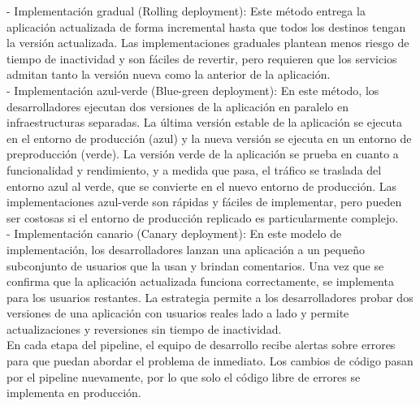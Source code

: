 \documentclass[12pt]{book}
\begin{document}
\begin{itemize}
    - Implementación gradual (Rolling deployment): Este método entrega la aplicación actualizada de forma incremental hasta que todos los destinos tengan la versión actualizada. Las implementaciones graduales plantean menos riesgo de tiempo de inactividad y son fáciles de revertir, pero requieren que los servicios admitan tanto la versión nueva como la anterior de la aplicación.\\
    - Implementación azul-verde (Blue-green deployment): En este método, los desarrolladores ejecutan dos versiones de la aplicación en paralelo en infraestructuras separadas. La última versión estable de la aplicación se ejecuta en el entorno de producción (azul) y la nueva versión se ejecuta en un entorno de preproducción (verde). La versión verde de la aplicación se prueba en cuanto a funcionalidad y rendimiento, y a medida que pasa, el tráfico se traslada del entorno azul al verde, que se convierte en el nuevo entorno de producción. Las implementaciones azul-verde son rápidas y fáciles de implementar, pero pueden ser costosas si el entorno de producción replicado es particularmente complejo.\\
    - Implementación canario (Canary deployment): En este modelo de implementación, los desarrolladores lanzan una aplicación a un pequeño subconjunto de usuarios que la usan y brindan comentarios. Una vez que se confirma que la aplicación actualizada funciona correctamente, se implementa para los usuarios restantes. La estrategia permite a los desarrolladores probar dos versiones de una aplicación con usuarios reales lado a lado y permite actualizaciones y reversiones sin tiempo de inactividad.\\

En cada etapa del pipeline, el equipo de desarrollo recibe alertas sobre errores para que puedan abordar el problema de inmediato. Los cambios de código pasan por el pipeline nuevamente, por lo que solo el código libre de errores se implementa en producción.
\end{itemize}
\end{document}
